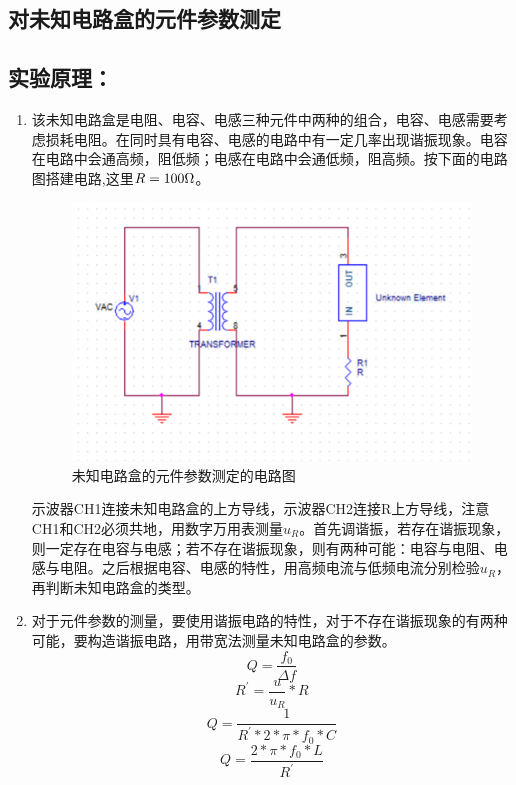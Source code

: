 \documentclass[a4paper,11pt]{article}
\begin{document}
\begin{appendix}
	\section{对未知电路盒的元件参数测定}
	\subsection{实验原理：}
	\begin{enumerate}
	\item 该未知电路盒是电阻、电容、电感三种元件中两种的组合，电容、电感需要考虑损耗电阻。在同时具有电容、电感的电路中有一定几率出现谐振现象。电容在电路中会通高频，阻低频；电感在电路中会通低频，阻高频。按下面的电路图搭建电路,这里$R = 100 \ohm$。
	\begin{figure}[H]
		\centering
		\includegraphics[width=.6\linewidth]{图片4.png}
		\caption{未知电路盒的元件参数测定的电路图}
	\end{figure}\noindent%
    示波器CH1连接未知电路盒的上方导线，示波器CH2连接R上方导线，注意CH1和CH2必须共地，用数字万用表测量$u_{R}$。首先调谐振，若存在谐振现象，则一定存在电容与电感；若不存在谐振现象，则有两种可能：电容与电阻、电感与电阻。之后根据电容、电感的特性，用高频电流与低频电流分别检验$u_{R}$，再判断未知电路盒的类型。
    \item 对于元件参数的测量，要使用谐振电路的特性，对于不存在谐振现象的有两种可能，要构造谐振电路，用带宽法测量未知电路盒的参数。$$
    Q = \dfrac{f_{0}}{\Delta f} $$
    $$ R^{\prime} = \frac{u}{u_{R}} * R $$
    $$ Q = \dfrac{1}{R^{\prime} * 2* \pi *f_{0}* C} $$
    $$ Q = \dfrac{ 2* \pi *f_{0}* L}{ R^{\prime} } $$
    \end{enumerate}

\end{appendix}
\end{document}
